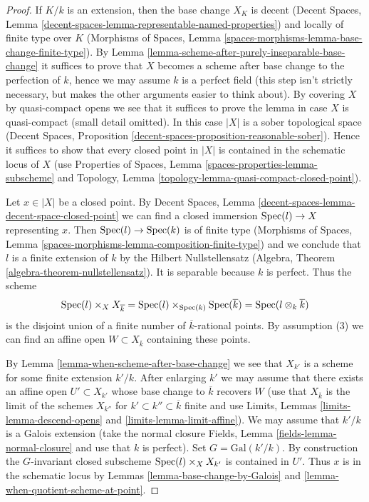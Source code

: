 \begin{proof}
If $K/k$ is an extension, then the base change $X_K$ is
decent (Decent Spaces, Lemma
\ref{decent-spaces-lemma-representable-named-properties})
and locally of finite type
over $K$ (Morphisms of Spaces, Lemma
\ref{spaces-morphisms-lemma-base-change-finite-type}).
By Lemma \ref{lemma-scheme-after-purely-inseparable-base-change}
it suffices to prove that $X$ becomes a scheme after base change to
the perfection of $k$, hence we may assume $k$ is a perfect field
(this step isn't strictly necessary, but makes the other arguments
easier to think about).
By covering $X$ by quasi-compact opens we see that it suffices to prove
the lemma in case $X$ is quasi-compact (small detail omitted).
In this case $|X|$ is a sober topological space
(Decent Spaces, Proposition
\ref{decent-spaces-proposition-reasonable-sober}).
Hence it suffices to show that every closed point in $|X|$
is contained in the schematic locus of $X$
(use Properties of Spaces, Lemma \ref{spaces-properties-lemma-subscheme} and
Topology, Lemma \ref{topology-lemma-quasi-compact-closed-point}).

\medskip\noindent
Let $x \in |X|$ be a closed point. By Decent Spaces, Lemma
\ref{decent-spaces-lemma-decent-space-closed-point}
we can find a closed immersion $\mathop{\mathrm{Spec}}(l) \to X$ representing $x$.
Then $\mathop{\mathrm{Spec}}(l) \to \mathop{\mathrm{Spec}}(k)$ is of finite type (Morphisms of Spaces,
Lemma \ref{spaces-morphisms-lemma-composition-finite-type}) and we
conclude that $l$ is a finite extension of $k$
by the Hilbert Nullstellensatz (Algebra, Theorem
\ref{algebra-theorem-nullstellensatz}). It is separable because
$k$ is perfect. Thus the scheme
$$
\mathop{\mathrm{Spec}}(l) \times_X X_{\overline{k}} =
\mathop{\mathrm{Spec}}(l) \times_{\mathop{\mathrm{Spec}}(k)} \mathop{\mathrm{Spec}}(\overline{k}) =
\mathop{\mathrm{Spec}}(l \otimes_k \overline{k})
$$
is the disjoint union of a finite number of $\overline{k}$-rational points.
By assumption (3) we can find an affine open $W \subset X_{\overline{k}}$
containing these points.

\medskip\noindent
By Lemma \ref{lemma-when-scheme-after-base-change} we see that $X_{k'}$
is a scheme for some finite extension $k'/k$. After enlarging
$k'$ we may assume that there exists an affine open $U' \subset X_{k'}$
whose base change to $\overline{k}$ recovers $W$
(use that $X_{\overline{k}}$ is the limit of the schemes $X_{k''}$
for $k' \subset k'' \subset \overline{k}$ finite and use
Limits, Lemmas \ref{limits-lemma-descend-opens} and
\ref{limits-lemma-limit-affine}). We may assume
that $k'/k$ is a Galois extension (take the normal closure
Fields, Lemma \ref{fields-lemma-normal-closure} and use
that $k$ is perfect). Set $G = \text{Gal}(k'/k)$.
By construction the $G$-invariant closed subscheme
$\mathop{\mathrm{Spec}}(l) \times_X X_{k'}$ is contained in $U'$.
Thus $x$ is in the schematic locus by
Lemmas \ref{lemma-base-change-by-Galois} and
\ref{lemma-when-quotient-scheme-at-point}.
\end{proof}

